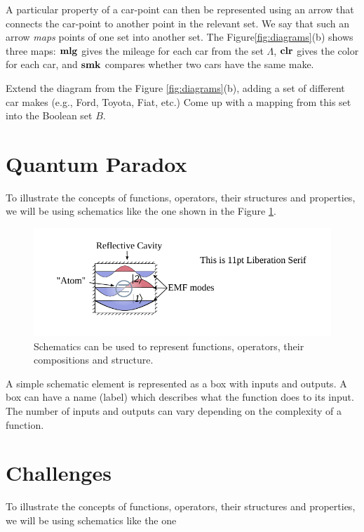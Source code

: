 A particular property of a car-point
can then be represented using an arrow that connects the car-point to
another point in the relevant set. We say that such an arrow \emph{maps}
points of one set into another set. The Figure\ref{fig:diagrams}(b)
shows three maps: $\textrm{\bf mlg}$ gives the mileage for each car from the
set $\Lambda$, $\textrm{\bf clr}$ gives the color for each car, and
$\textrm{\bf smk}$ compares whether two cars have the same make.

\begin{exercise}
Extend the diagram from the Figure \ref{fig:diagrams}(b), adding a set
of different car makes (e.g., Ford, Toyota, Fiat, etc.) Come up with a
mapping from this set into the Boolean set $B$.
\label{exe:carMakesSet}
\end{exercise}

\section{Quantum Paradox}
To illustrate the concepts of functions, operators, their structures and
properties, we will be using schematics like the one
shown in the Figure \ref{fig:schematicExample}.
\begin{figure}%
  \includegraphics[scale=1.0]{defaultFigureTemplate}
  \caption{Schematics can be used to represent functions, operators,
    their compositions and structure.}
  \label{fig:schematicExample}
\end{figure}

A simple schematic element is represented as a box with inputs
and outputs. A box can have a name (label) which describes what the
function does to its input.  The number of inputs and
outputs can vary depending on the complexity of a function.

\section{Challenges}
To illustrate the concepts of functions, operators, their structures and
properties, we will be using schematics like the one

